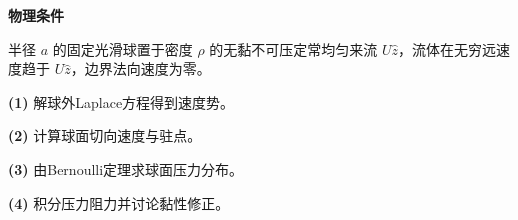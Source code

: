 \textbf{物理条件}\par 半径 \(a\) 的固定光滑球置于密度 \(\rho\) 的无黏不可压定常均匀来流 \(U\hat z\)，流体在无穷远速度趋于 \(U\hat z\)，边界法向速度为零。
\par\noindent\textbf{(1)} 解球外Laplace方程得到速度势。
\par\noindent\textbf{(2)} 计算球面切向速度与驻点。
\par\noindent\textbf{(3)} 由Bernoulli定理求球面压力分布。
\par\noindent\textbf{(4)} 积分压力阻力并讨论黏性修正。
